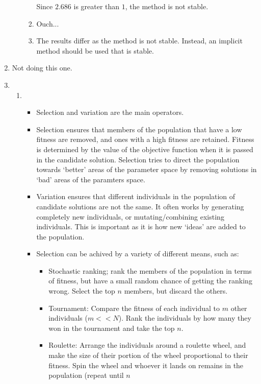 \documentclass{report}
\begin{document}
\begin{enumerate}
\begin{enumerate}
\begin{enumerate}
      Since $2.686$ is greater than $1$, the method is not stable.
    \item Ouch...
    \item The results differ as the method is not stable. Instead, an
      implicit method should be used that is stable.
    \end{enumerate}
  \end{enumerate}
  \item Not doing this one.
  \item
    \begin{enumerate}
    \item
      \begin{itemize}
      \item Selection and variation are the main operators.
      \item Selection ensures that members of the population that have
        a low fitness are removed, and ones with a high fitness are
        retained. Fitness is determined by the value of the objective
        function when it is passed in the candidate
        solution. Selection tries to direct the population towards
        `better' areas of the parameter space by removing solutions in
        `bad' areas of the paramters space.
      \item Variation ensures that different individuals in the
        population of candidate solutions are not the same. It often
        works by generating completely new individuals, or
        mutating/combining existing individuals. This is important as
        it is how new `ideas' are added to the population.
      \item Selection can be achived by a variety of different means,
        such as:
        \begin{itemize}
        \item Stochastic ranking; rank the members of the population
          in terms of fitness, but have a small random chance of
          getting the ranking wrong. Select the top $n$ members, but
          discard the others.
        \item Tournament: Compare the fitness of each individual to
          $m$ other individuals ($m << N$). Rank the individuals by
          how many they won in the tournament and take the top $n$.
        \item Roulette: Arrange the individuals around a roulette
          wheel, and make the size of their portion of the wheel
          proportional to their fitness. Spin the wheel and whoever it
          lands on remains in the population (repeat until $n$

\end{itemize}
\end{itemize}
\end{enumerate}
\end{enumerate}
\end{document}
